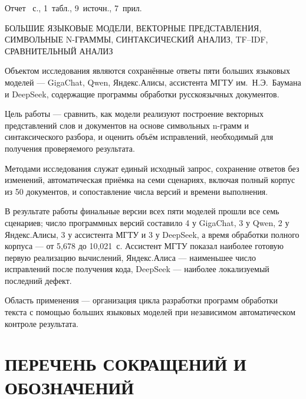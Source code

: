 




Отчет \pageref{LastPage}~с., 1~табл., 9~источн., 7~прил.

{\noindent\raggedright{}\relax
БОЛЬШИЕ ЯЗЫКОВЫЕ МОДЕЛИ, ВЕКТОРНЫЕ ПРЕДСТАВЛЕНИЯ, СИМВОЛЬНЫЕ N-ГРАММЫ, СИНТАКСИЧЕСКИЙ АНАЛИЗ, TF--IDF, СРАВНИТЕЛЬНЫЙ АНАЛИЗ\par}

Объектом исследования являются сохранённые ответы пяти больших языковых моделей --- GigaChat, Qwen, Яндекс.Алисы, ассистента МГТУ им.~Н.Э.~Баумана и DeepSeek, содержащие программы обработки русскоязычных документов.

Цель работы --- сравнить, как модели реализуют построение векторных представлений слов и документов на основе символьных n-грамм и синтаксического разбора, и оценить объём исправлений, необходимый для получения проверяемого результата.

Методами исследования служат единый исходный запрос, сохранение ответов без изменений, автоматическая приёмка на семи сценариях, включая полный корпус из 50 документов, и сопоставление числа версий и времени выполнения.

В результате работы финальные версии всех пяти моделей прошли все семь сценариев; число программных версий составило 4 у GigaChat, 3 у Qwen, 2 у Яндекс.Алисы, 3 у ассистента МГТУ и 3 у DeepSeek, а время обработки полного корпуса --- от 5,678 до 10,021~с. Ассистент МГТУ показал наиболее готовую первую реализацию вычислений, Яндекс.Алиса --- наименьшее число исправлений после получения кода, DeepSeek --- наиболее локализуемый последний дефект.

Область применения --- организация цикла разработки программ обработки текста с помощью больших языковых моделей при независимом автоматическом контроле результата.

\clearpage

\renewcommand{\cfttoctitlefont}{\hfill\normalfont\normalsize\bfseries}
\renewcommand{\cftaftertoctitle}{\hfill}
\setlength{\cftbeforetoctitleskip}{0pt}
\setlength{\cftaftertoctitleskip}{\baselineskip}
\clearpage
\tableofcontents

\chapter*{ПЕРЕЧЕНЬ СОКРАЩЕНИЙ И ОБОЗНАЧЕНИЙ}

